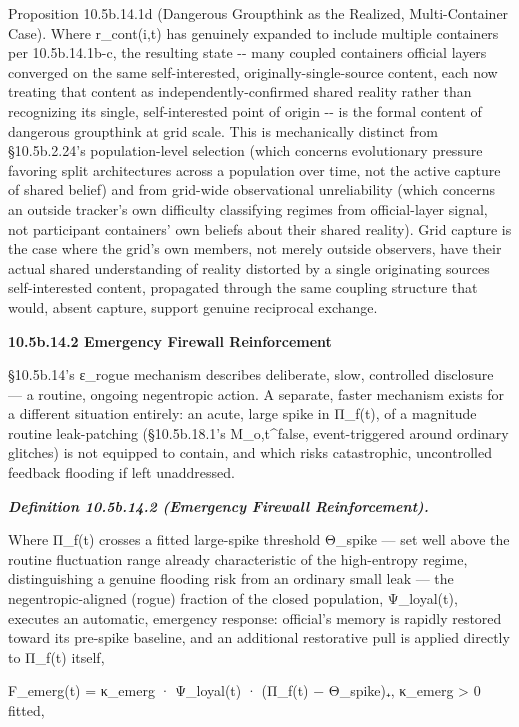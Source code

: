 \documentclass[
]{article}
\begin{document}
Proposition 10.5b.14.1d (Dangerous Groupthink as the Realized,
Multi-Container Case). Where r\_cont(i,t) has genuinely expanded to
include multiple containers per 10.5b.14.1b-c, the resulting state -\/-
many coupled containers official layers converged on the same
self-interested, originally-single-source content, each now treating
that content as independently-confirmed shared reality rather than
recognizing its single, self-interested point of origin -\/- is the
formal content of dangerous groupthink at grid scale. This is
mechanically distinct from §10.5b.2.24's population-level selection
(which concerns evolutionary pressure favoring split architectures
across a population over time, not the active capture of shared belief)
and from grid-wide observational unreliability (which concerns an
outside tracker's own difficulty classifying regimes from official-layer
signal, not participant containers' own beliefs about their shared
reality). Grid capture is the case where the grid's own members, not
merely outside observers, have their actual shared understanding of
reality distorted by a single originating sources self-interested
content, propagated through the same coupling structure that would,
absent capture, support genuine reciprocal exchange.

\textbf{10.5b.14.2 Emergency Firewall Reinforcement}

§10.5b.14's ε\_rogue mechanism describes deliberate, slow, controlled
disclosure --- a routine, ongoing negentropic action. A separate, faster
mechanism exists for a different situation entirely: an acute, large
spike in Π\_f(t), of a magnitude routine leak-patching (§10.5b.18.1's
M\_o,t\^{}false, event-triggered around ordinary glitches) is not
equipped to contain, and which risks catastrophic, uncontrolled feedback
flooding if left unaddressed.

\emph{\textbf{Definition 10.5b.14.2 (Emergency Firewall
Reinforcement).}}

Where Π\_f(t) crosses a fitted large-spike threshold Θ\_spike --- set
well above the routine fluctuation range already characteristic of the
high-entropy regime, distinguishing a genuine flooding risk from an
ordinary small leak --- the negentropic-aligned (rogue) fraction of the
closed population, Ψ\_loyal(t), executes an automatic, emergency
response: official's memory is rapidly restored toward its pre-spike
baseline, and an additional restorative pull is applied directly to
Π\_f(t) itself,

F\_emerg(t) = κ\_emerg · Ψ\_loyal(t) · (Π\_f(t) − Θ\_spike)₊, κ\_emerg
\textgreater{} 0 fitted,
\end{document}
